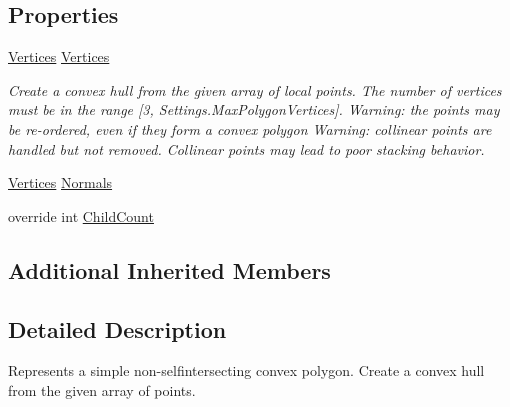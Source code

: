 \subsection*{Properties}
\begin{DoxyCompactItemize}
\item 
\hyperlink{class_farseer_physics_1_1_common_1_1_vertices}{Vertices} \hyperlink{class_farseer_physics_1_1_collision_1_1_shapes_1_1_polygon_shape_a6a72b55efcc554264a65f783327be229}{Vertices}
\begin{DoxyCompactList}\small\item\em Create a convex hull from the given array of local points. The number of vertices must be in the range \mbox{[}3, Settings.\+Max\+Polygon\+Vertices\mbox{]}. Warning\+: the points may be re-\/ordered, even if they form a convex polygon Warning\+: collinear points are handled but not removed. Collinear points may lead to poor stacking behavior. \end{DoxyCompactList}\item 
\hyperlink{class_farseer_physics_1_1_common_1_1_vertices}{Vertices} \hyperlink{class_farseer_physics_1_1_collision_1_1_shapes_1_1_polygon_shape_a4086adf8267a351bdb82df98bffe9892}{Normals}
\item 
override int \hyperlink{class_farseer_physics_1_1_collision_1_1_shapes_1_1_polygon_shape_ae3ce18e76aa9e2ddc7089ea156d12ed4}{Child\+Count}
\end{DoxyCompactItemize}
\subsection*{Additional Inherited Members}


\subsection{Detailed Description}
Represents a simple non-\/selfintersecting convex polygon. Create a convex hull from the given array of points. 



